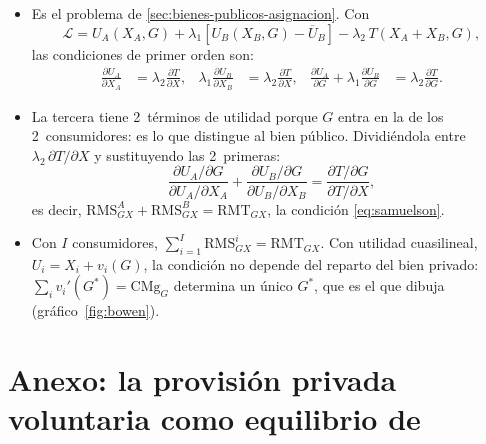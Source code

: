 \documentclass[11pt]{article}
\begin{document}
\begin{itemize}
\item Es el problema de \ref{sec:bienes-publicos-asignacion}. Con
  $$\mathcal{L}=U_A(X_A,G)+\lambda_1[U_B(X_B,G)-\overline{U}_B]-\lambda_2\,T(X_A+X_B,G),$$
  las condiciones de primer orden son:
  \begin{align*}
  \frac{\partial U_A}{\partial X_A}&=\lambda_2\frac{\partial T}{\partial X}, & \lambda_1\frac{\partial U_B}{\partial X_B}&=\lambda_2\frac{\partial T}{\partial X}, & \frac{\partial U_A}{\partial G}+\lambda_1\frac{\partial U_B}{\partial G}&=\lambda_2\frac{\partial T}{\partial G}.
  \end{align*}
\item La tercera tiene 2~términos de utilidad porque $G$ entra en la de los 2~consumidores: es lo que distingue al bien público. Dividiéndola entre $\lambda_2\,\partial T/\partial X$ y sustituyendo las 2~primeras:
  $$\frac{\partial U_A/\partial G}{\partial U_A/\partial X_A}+\frac{\partial U_B/\partial G}{\partial U_B/\partial X_B}=\frac{\partial T/\partial G}{\partial T/\partial X},$$
  es decir, $\mathrm{RMS}^A_{GX}+\mathrm{RMS}^B_{GX}=\mathrm{RMT}_{GX}$, la condición \eqref{eq:samuelson}.~\findemo
\item Con $I$ consumidores, $\sum_{i=1}^{I}\mathrm{RMS}^i_{GX}=\mathrm{RMT}_{GX}$. Con utilidad cuasilineal, $U_i=X_i+v_i(G)$, la condición no depende del reparto del bien privado: $\sum_iv_i'(G^*)=\mathrm{CMg}_G$ determina un único $G^*$, que es el que dibuja  (gráfico~\ref{fig:bowen}).
\end{itemize}

\section{Anexo: la provisión privada voluntaria\cortetitulo{} como equilibrio de }\label{anexo:provision-privada}
\end{document}
